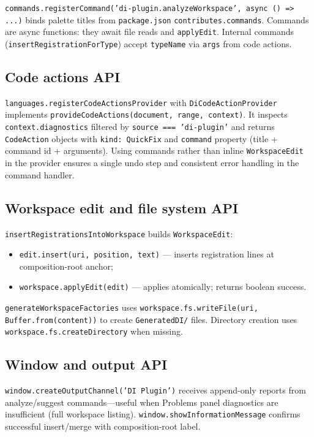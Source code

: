 \texttt{commands.registerCommand('di-plugin.analyzeWorkspace', async () => ...)} binds palette titles from \texttt{package.json} \texttt{contributes.commands}. Commands are async functions: they await file reads and \texttt{applyEdit}. Internal commands (\texttt{insertRegistrationForType}) accept \texttt{typeName} via \texttt{args} from code actions.

\subsection{Code actions API}

\texttt{languages.registerCodeActionsProvider} with \texttt{DiCodeActionProvider} implements \texttt{provideCodeActions(document, range, context)}. It inspects \texttt{context.diagnostics} filtered by \texttt{source === 'di-plugin'} and returns \texttt{CodeAction} objects with \texttt{kind: QuickFix} and \texttt{command} property (title + command id + arguments). Using commands rather than inline \texttt{WorkspaceEdit} in the provider ensures a single undo step and consistent error handling in the command handler.

\subsection{Workspace edit and file system API}

\texttt{insertRegistrationsIntoWorkspace} builds \texttt{WorkspaceEdit}:
\begin{itemize}
	\item \texttt{edit.insert(uri, position, text)} --- inserts registration lines at composition-root anchor;
	\item \texttt{workspace.applyEdit(edit)} --- applies atomically; returns boolean success.
\end{itemize}

\texttt{generateWorkspaceFactories} uses \texttt{workspace.fs.writeFile(uri, Buffer.from(content))} to create \texttt{GeneratedDI/} files. Directory creation uses \texttt{workspace.fs.createDirectory} when missing.

\subsection{Window and output API}

\texttt{window.createOutputChannel('DI Plugin')} receives append-only reports from analyze/suggest commands---useful when Problems panel diagnostics are insufficient (full workspace listing). \texttt{window.showInformationMessage} confirms successful insert/merge with composition-root label.

